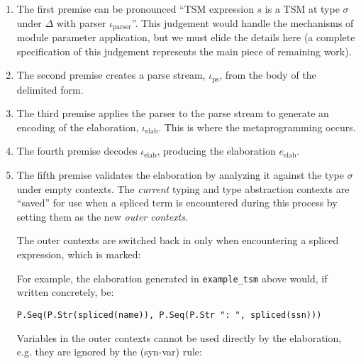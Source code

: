 \begin{enumerate}
\item The first premise can be pronounced ``TSM expression $s$ is a TSM at type $\sigma$ under $\Delta$ with parser $\iota_\text{parser}$''. This judgement would handle the mechanisms of module parameter application, but we must elide the details here (a complete specification of this judgement represents the main piece of remaining work). %
\item The second premise creates a parse stream, $\iota_\text{ps}$, from the body of the delimited form.
\item The third premise applies the parser to the parse stream to generate an encoding of the elaboration, $\iota_\text{elab}$. This is where the metaprogramming occurs.
\item The fourth premise decodes $\iota_\text{elab}$, producing the elaboration $e_\text{elab}$.
\item The fifth premise validates the elaboration by analyzing it against the type $\sigma$ under empty contexts. The \emph{current} typing and type abstraction contexts are ``saved'' for use when a spliced term is encountered during this process by setting them as the new \emph{outer contexts}.

The outer contexts are switched back in only when encountering a spliced expression, which is marked:
\begin{mathpar}

\end{mathpar}
For example, the elaboration generated in \lstinline{example_tsm} above would, if written concretely, be:
\begin{lstlisting}[numbers=none]
P.Seq(P.Str(spliced(name)), P.Seq(P.Str ": ", spliced(ssn)))
\end{lstlisting}

Variables in the outer contexts cannot be used directly by the elaboration, e.g. they are ignored by the (syn-var) rule:
\begin{mathpar}
\end{mathpar}

\end{enumerate}
